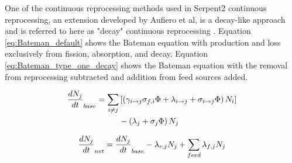 One of the continuous reprocessing methods used in Serpent2 continuous reprocessing, an extension developed by Aufiero et al, is a decay-like approach and is referred to here as "decay" continuous reprocessing \cite{aufiero_extended_2013}. Equation \eqref{eq:Bateman_default} shows the Bateman equation with production and loss exclusively from fission, absorption, and decay.
Equation \eqref{eq:Bateman_type_one_decay} shows the Bateman equation with the removal from reprocessing subtracted and addition from feed sources added.

\begin{equation} \hfill
\begin{split}
\frac{dN_j}{dt}_{base} = \sum_{i \neq j}  & \left [ \left( \gamma_{i \rightarrow j} \sigma_{f, i} \Phi + \lambda _{i \rightarrow j} + \sigma_{i \rightarrow j} \Phi \right) N_i \right ]\\
 & - \left ( \lambda_j + \sigma_j \Phi \right ) N_j
\end{split}
\hfill\label{eq:Bateman_default} \end{equation}

\begin{equation} \hfill
\frac{dN_j}{dt}_{net} = \frac{dN_j}{dt}_{base} -  \lambda_{r, j} N_j + \sum_{feed} \lambda _{f, j} N_j
\hfill\label{eq:Bateman_type_one_decay} \end{equation}

